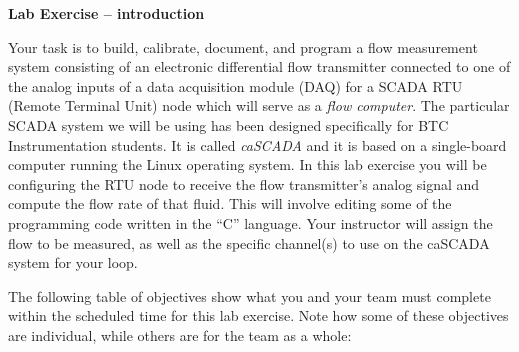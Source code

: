 

\noindent
{\bf Lab Exercise -- introduction}

\vskip 5pt

Your task is to build, calibrate, document, and program a flow measurement system consisting of an electronic differential flow transmitter connected to one of the analog inputs of a data acquisition module (DAQ) for a SCADA RTU (Remote Terminal Unit) node which will serve as a {\it flow computer}.  The particular SCADA system we will be using has been designed specifically for BTC Instrumentation students.  It is called {\sl caSCADA} and it is based on a single-board computer running the Linux operating system.  In this lab exercise you will be configuring the RTU node to receive the flow transmitter's analog signal and compute the flow rate of that fluid.  This will involve editing some of the programming code written in the ``C'' language.  Your instructor will assign the flow to be measured, as well as the specific channel(s) to use on the caSCADA system for your loop.

The following table of objectives show what you and your team must complete within the scheduled time for this lab exercise.  Note how some of these objectives are individual, while others are for the team as a whole:



